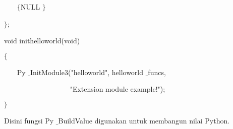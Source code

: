 \documentclass{wileySix}
\begin{document}
\begin{myEnumerate}
{\begin{myEnumerate}
\noindent 
~~~  $  \{  $NULL $  \}  $ \par
\noindent 
$  \}  $; \par
\vspace{12pt}
\noindent 
void inithelloworld(void) \par
\noindent 
$  \{  $ \par
\noindent 
~~~ Py $  \_  $InitModule3("helloworld", helloworld $  \_  $funcs, \par
\noindent 
~~~~~~~~~~~~~~~~~~ "Extension module example!"); \par
\noindent 
$  \}  $ \par
\vspace{12pt}
\vspace{12pt}
\noindent 
\hspace*{0.5in} Disini fungsi Py $  \_  $BuildValue digunakan untuk membangun nilai Python.  \par
\vspace{12pt}
\vspace{12pt}
\noindent 


\end{myEnumerate}}
\end{myEnumerate}
\end{document}
